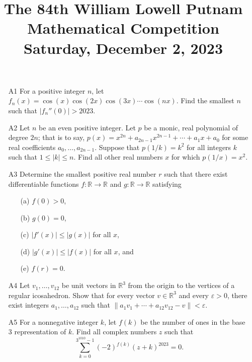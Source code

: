 \documentclass[amssymb,twocolumn,pra,10pt,aps,nofootinbib]{revtex4-1}
\begin{document}
    \title{The 84th William Lowell Putnam Mathematical Competition \\
        Saturday, December 2, 2023}
    \maketitle

    \begin{itemize}

    \item[A1] For a positive integer $n$, let $f_n(x) = \cos(x) \cos(2x) \cos(3x) \cdots \cos(nx)$. Find the smallest $n$ such that $|f_n''(0)| > 2023$.

    \item[A2] Let $n$ be an even positive integer. Let $p$ be a monic, real polynomial of degree $2n$; that is to say, $p(x) = x^{2n} + a_{2n-1} x^{2n-1} + \cdots + a_1 x + a_0$ for some real coefficients $a_0, \dots, a_{2n-1}$. Suppose that $p(1/k) = k^2$ for all integers $k$ such that $1 \leq |k| \leq n$. Find all other real numbers $x$ for which $p(1/x) = x^2$.

    \item[A3] Determine the smallest positive real number $r$ such that there exist differentiable functions $f\colon \mathbb{R} \to \mathbb{R}$ and $g\colon \mathbb{R} \to \mathbb{R}$ satisfying 
    \begin{enumerate}


    \item[(a)] $f(0) > 0$,

    \item[(b)] $g(0) = 0$,

    \item[(c)] $|f'(x)| \leq |g(x)|$ for all $x$,

    \item[(d)] $|g'(x)| \leq |f(x)|$ for all $x$, and

    \item[(e)] $f(r) = 0$. 
    \end{enumerate}


    \item[A4] Let $v_1, \dots, v_{12}$ be unit vectors in $\mathbb{R}^3$ from the origin to the vertices of a regular icosahedron. Show that for every vector $v \in \mathbb{R}^3$ and every $\varepsilon > 0$, there exist integers $a_1,\dots,a_{12}$ such that $\| a_1 v_1 + \cdots + a_{12} v_{12} - v \| < \varepsilon$.

    \item[A5] For a nonnegative integer $k$, let $f(k)$ be the number of ones in the base 3 representation of $k$. Find all complex numbers $z$ such that \[ \sum_{k=0}^{3^{1010}-1} (-2)^{f(k)} (z+k)^{2023} = 0. \]


\end{itemize}
\end{document}
